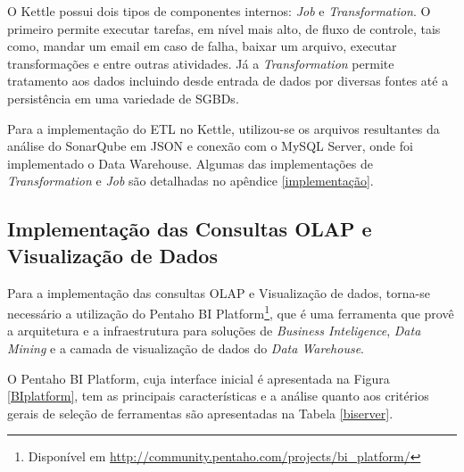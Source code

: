 O Kettle possui dois tipos de componentes internos: \textit{Job} e \textit{Transformation}. O primeiro permite executar tarefas, em nível mais alto, de fluxo de controle, tais como, mandar um email em caso de falha, baixar um arquivo, executar transformações  e entre outras atividades. Já a \textit{Transformation} permite tratamento aos dados incluindo desde entrada de dados por diversas fontes até a persistência em uma variedade de SGBDs.


Para a implementação do ETL no Kettle, utilizou-se os arquivos resultantes da análise do SonarQube em JSON e conexão com o MySQL Server, onde foi implementado o Data Warehouse. Algumas das implementações  de \textit{Transformation} e \textit{Job} são detalhadas no apêndice \ref{implementação}.


\subsection{Implementação das Consultas OLAP e Visualização de Dados}

Para a implementação das consultas OLAP e Visualização de dados, torna-se necessário a utilização do Pentaho BI Platform\footnote{Disponível em \url{http://community.pentaho.com/projects/bi_platform/}}, que é uma ferramenta que provê a arquitetura e a infraestrutura para soluções de \textit{Business Inteligence}, \textit{Data Mining} e a camada de visualização de dados do \textit{Data Warehouse}.


O Pentaho BI Platform, cuja interface inicial é apresentada na Figura \ref{BIplatform}, tem as principais características e a análise quanto aos critérios gerais de seleção de ferramentas são apresentadas na Tabela \ref{biserver}. 


